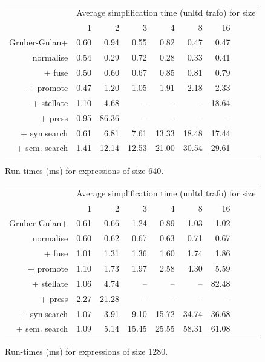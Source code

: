 \begin{figure}\begin{tabular}{rrrrrrrrrr}
 & \multicolumn{9}{c}{Average simplification time (unltd trafo) for size} \\
 & 1 & 2 & 3 & 4 & 8 & 16 \\
Gruber-Gulan+ & 0.60 & 0.94 & 0.55 & 0.82 & 0.47 & 0.47 \\
normalise & 0.54 & 0.29 & 0.72 & 0.28 & 0.33 & 0.41 \\
+ fuse & 0.50 & 0.60 & 0.67 & 0.85 & 0.81 & 0.79 \\
+ promote & 0.47 & 1.20 & 1.05 & 1.91 & 2.18 & 2.33 \\
+ stellate & 1.10 & 4.68 & -- & -- & -- & 18.64 \\
+ press & 0.95 & 86.36 & -- & -- & -- & -- \\
+ syn.search & 0.61 & 6.81 & 7.61 & 13.33 & 18.48 & 17.44 \\
+ sem. search & 1.41 & 12.14 & 12.53 & 21.00 & 30.54 & 29.61 \\
\end{tabular}\caption{Run-times (ms) for expressions of size 640.}\end{figure}
\begin{figure}\begin{tabular}{rrrrrrrrrr}
 & \multicolumn{9}{c}{Average simplification time (unltd trafo) for size} \\
 & 1 & 2 & 3 & 4 & 8 & 16 \\
Gruber-Gulan+ & 0.61 & 0.66 & 1.24 & 0.89 & 1.03 & 1.02 \\
normalise & 0.60 & 0.62 & 0.67 & 0.63 & 0.71 & 0.67 \\
+ fuse & 1.01 & 1.31 & 1.36 & 1.60 & 1.74 & 1.86 \\
+ promote & 1.10 & 1.73 & 1.97 & 2.58 & 4.30 & 5.59 \\
+ stellate & 1.06 & 4.74 & -- & -- & -- & 82.48 \\
+ press & 2.27 & 21.28 & -- & -- & -- & -- \\
+ syn.search & 1.07 & 3.91 & 9.10 & 15.72 & 34.74 & 36.68 \\
+ sem. search & 1.09 & 5.14 & 15.45 & 25.55 & 58.31 & 61.08 \\
\end{tabular}\caption{Run-times (ms) for expressions of size 1280.}\end{figure}
